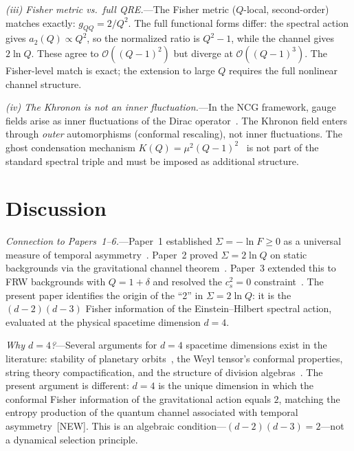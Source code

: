 \documentclass[prl,twocolumn,superscriptaddress,longbibliography]{revtex4-2}
\begin{document}
\emph{(iii) Fisher metric vs.\ full QRE.}---The
Fisher metric ($Q$-local, second-order)
matches exactly: $g_{QQ} = 2/Q^2$.
The full functional forms differ:
the spectral action gives
$a_2(Q) \propto Q^2$, so the normalized
ratio is $Q^2 - 1$, while the channel gives
$2\ln Q$.
These agree to $\mathcal{O}((Q-1)^2)$
but diverge at $\mathcal{O}((Q-1)^3)$.
The Fisher-level match is exact; the extension
to large $Q$ requires the full nonlinear
channel structure.

\emph{(iv) The Khronon is not an inner
fluctuation.}---In the NCG framework, gauge fields
arise as inner fluctuations of the Dirac
operator~\cite{CC1996,vS2024}.
The Khronon field enters through
\emph{outer} automorphisms (conformal rescaling),
not inner fluctuations.
The ghost condensation mechanism
$K(Q) = \mu^2(Q-1)^2$~\cite{BS2024} is not
part of the standard spectral triple and must
be imposed as additional structure.


\section{Discussion}
\label{sec:discussion}

\emph{Connection to Papers~1--6.}---Paper~1
established $\Sigma = -\ln F \geq 0$ as a
universal measure of temporal
asymmetry~\cite{PaperI}.
Paper~2 proved $\Sigma = 2\ln Q$ on static
backgrounds via the gravitational channel
theorem~\cite{PaperII}.
Paper~3 extended this to FRW backgrounds with
$Q = 1+\delta$ and resolved the
$c_s^2 = 0$ constraint~\cite{PaperIII}.
The present paper identifies the origin of the
``2'' in $\Sigma = 2\ln Q$: it is the
$(d-2)(d-3)$ Fisher information of the
Einstein--Hilbert spectral action, evaluated at
the physical spacetime dimension $d=4$.

\emph{Why $d=4$?}---Several arguments for
$d=4$ spacetime dimensions exist in the
literature: stability of planetary
orbits~\cite{Ehrenfest1917}, the Weyl
tensor's conformal properties, string theory
compactification, and the structure of division
algebras~\cite{BaezHuerta2010}.
The present argument is different: $d=4$ is
the unique dimension in which the conformal
Fisher information of the gravitational action
equals $2$, matching the entropy production
of the quantum channel associated with
temporal asymmetry~[NEW].
This is an algebraic condition---$(d-2)(d-3) = 2$---not
a dynamical selection principle.
\end{document}
